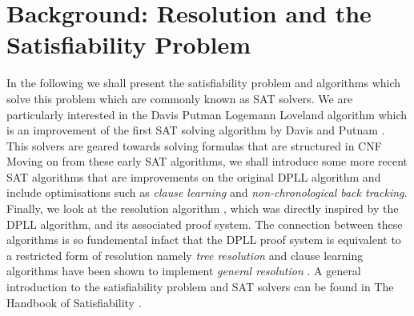 \chapter{Background: Resolution and the Satisfiability Problem}
In the following we shall present the satisfiability problem and  algorithms which solve this problem which are commonly known as SAT solvers. We are particularly interested in the Davis Putman Logemann Loveland algorithm \cite{DPLL} which is an improvement of the first SAT solving algorithm by Davis and Putnam \cite{MD60}. This solvers are geared towards solving formulas that are structured in CNF Moving on from these early SAT algorithms, we shall introduce some more recent SAT algorithms that are improvements on the original DPLL algorithm and include optimisations such as \emph{clause learning} and \emph{non-chronological back tracking}. Finally, we look at the resolution algorithm \cite{JR65}, which was directly inspired by the DPLL algorithm, and its associated proof system. The connection between these algorithms is so fundemental infact that the DPLL proof system is equivalent to a restricted form of resolution namely \emph{tree resolution} \cite{} and clause learning algorithms have been shown to implement \emph{general resolution} \cite{}. A general introduction to the satisfiability problem and SAT solvers can be found in The Handbook of Satisfiability \cite{AB09b}.


